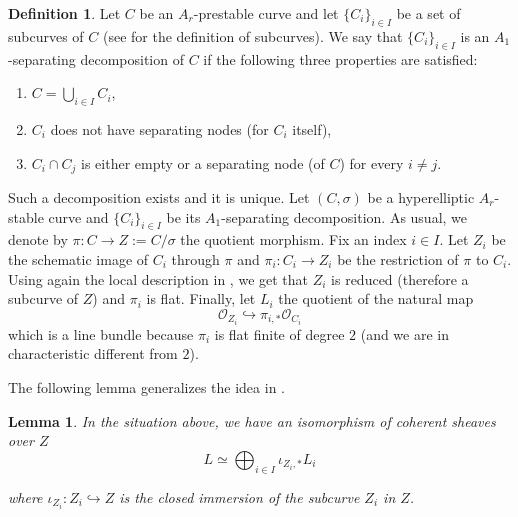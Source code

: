\documentclass{alggeom}
\numberwithin{equation}{section}
\numberwithin{subsection}{section}
\newtheorem{lemma}[theorem]{Lemma}
\theoremstyle{definition}
\newtheorem{definition}[theorem]{Definition}
\theoremstyle{remark}
\newcommand\cO{\mathcal{O}} \newcommand\cP{\mathcal{P}}
\begin{document}
\begin{definition}\label{def:sep-dec}
	Let $C$ be an $A_r$-prestable curve and let $\{C_i\}_{i \in I}$ be a set of subcurves of $C$ (see  for the definition of subcurves). We  say that $\{C_i\}_{i \in I}$ is an $A_1$-separating decomposition of $C$ if the following three properties are satisfied:
\begin{enumerate}
	\item $C=\bigcup_{i \in I} C_i$,
	\item $C_i$ does not have separating nodes (for $C_i$ itself),
	\item $C_i\cap C_j$ is either empty or a separating node (of $C$) for every $i\neq j$. 
\end{enumerate} 
\end{definition}
 Such a decomposition exists and it is unique. 
 Let $(C,\sigma)$ be a hyperelliptic $A_r$-stable curve and $\{C_i\}_{i \in I}$ be its $A_1$-separating decomposition. As usual, we denote by $\pi:C \rightarrow Z:=C/\sigma$ the quotient morphism. Fix an index $i \in I$. Let $Z_i$ be the schematic image of $C_i$ through $\pi$ and $\pi_i:C_i \rightarrow Z_i$ be the restriction of $\pi$ to $C_i$. Using again the local description in , we get that $Z_i$ is reduced (therefore a subcurve of $Z$) and $\pi_i$ is flat. Finally, let $L_i$ the quotient of the natural map 
$$\cO_{Z_i} \hookrightarrow \pi_{i,*}\cO_{C_i}$$
which is a line bundle because $\pi_i$ is flat finite of degree $2$ (and we are in characteristic different from $2$).

The following lemma generalizes the idea in .

\begin{lemma}\label{lem:decomp-line-bundle}
In the situation above, we have an isomorphism of coherent sheaves over $Z$
$$ L \simeq \bigoplus_{i \in I} \iota_{Z_i,*}L_i$$

where $\iota_{Z_i}:Z_i \hookrightarrow Z$ is the closed immersion of the subcurve $Z_i$ in $Z$.

\end{lemma}
\end{document}
